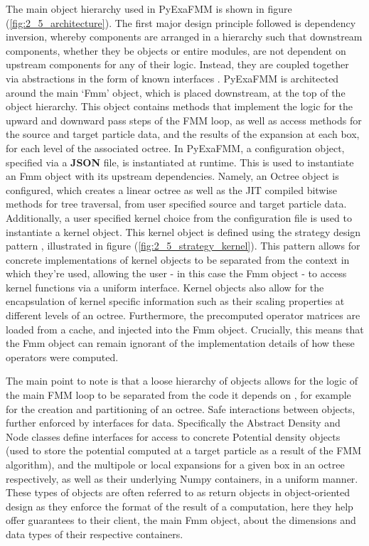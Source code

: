 The main object hierarchy used in \gls{PyExaFMM} is shown in figure
(\ref{fig:2_5_architecture}). The first major design principle followed is dependency
inversion, whereby components are arranged in a hierarchy such that downstream
components, whether they be objects or entire modules, are not dependent on
upstream components for any of their logic. Instead, they are coupled together via
abstractions in the form of known interfaces \cite{Gamma:1994:Addison}. \gls{PyExaFMM} is architected
around the main `Fmm' object, which is placed downstream, at the top of the object hierarchy.
This object contains methods that implement the logic for the
upward and downward pass steps of the \gls{FMM} loop, as well as access methods
for the source and target particle data, and the results of the expansion at each box, for each level of the associated octree.
In \gls{PyExaFMM}, a configuration object, specified via a \textbf{\gls{JSON}} file, is instantiated
at runtime. This is used to instantiate an Fmm object with its upstream dependencies.
Namely, an Octree object is configured, which creates a linear octree as well
as the \gls{JIT} compiled bitwise methods for tree traversal, from user
specified source and target particle data. Additionally, a user specified kernel choice
from the configuration file is used to instantiate a kernel object.
This kernel object is defined using the strategy design pattern
\cite{Gamma:1994:Addison}, illustrated in figure (\ref{fig:2_5_strategy_kernel}).
This pattern allows for concrete implementations of kernel objects to be separated
from the context in which they're used, allowing the user - in this case the
Fmm object - to access kernel functions via a uniform interface. Kernel
objects also allow for the encapsulation of
kernel specific information such as their scaling properties at different levels
of an octree. Furthermore, the precomputed operator matrices are loaded from a cache,
and injected into the Fmm object. Crucially, this means that the Fmm object can
remain ignorant of the implementation details of how these operators were computed.

The main point to note is that a loose hierarchy of objects allows for
the logic of the main \gls{FMM} loop to be separated from the code it depends on
, for example for the creation and partitioning of an octree.
Safe interactions between objects, further enforced by interfaces for data.
Specifically the Abstract Density and Node classes define interfaces for access to concrete Potential density
objects (used to store the potential computed at a target particle as a result
of the FMM algorithm), and the multipole or local expansions for a given box in an octree respectively,
as well as their underlying Numpy containers, in a uniform manner.
These types of objects are often referred to as return objects in object-oriented
design as they enforce the format of the result of a computation,
here they help offer guarantees to their client, the main Fmm object,
about the dimensions and data types of their respective containers.

